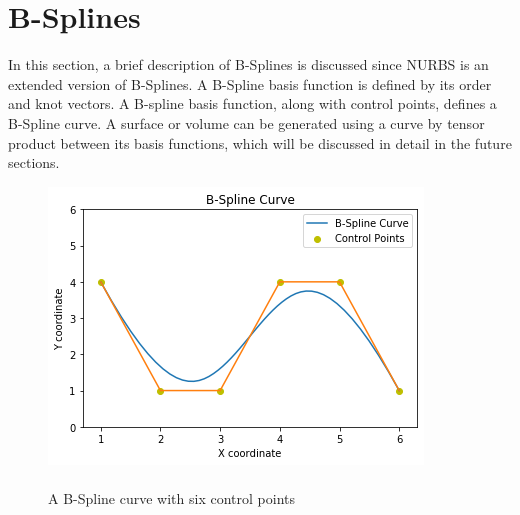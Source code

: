 \documentclass[11pt]{article}
\begin{document}
\newpage

\section{B-Splines } \label{B_Spline}
In this section, a brief description of B-Splines is discussed since NURBS is an extended version of B-Splines. A B-Spline basis function is defined by its order and knot vectors. A B-spline basis function, along with control points, defines a B-Spline curve. A surface or volume can be generated using a curve by tensor product between its basis functions, which will be discussed in detail in the future sections.
\begin{figure}[H]
	\begin{center}
		\includegraphics[scale=0.7]{B_Spline.png} 
		\caption{\\A B-Spline curve with six control points}\label{B_Spline}
	\end{center}	
\end{figure}
\end{document}
